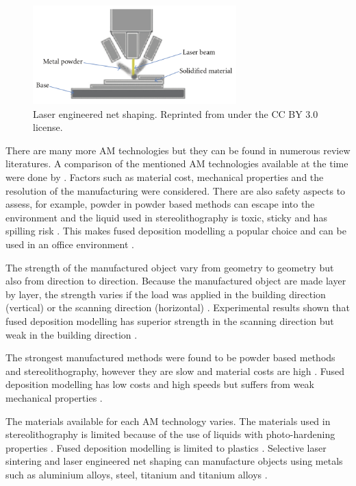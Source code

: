 \begin{figure}
  \centering
  \includegraphics[width=0.7\textwidth]{../figures/literatureReview/literature_lens.png}
  \caption{Laser engineered net shaping. Reprinted from \citep{wong2012review} under the CC BY 3.0 license.}
  \label{fig:literature_lens}
\end{figure}

There are many more AM technologies but they can be found in numerous review literatures. A comparison of the mentioned AM technologies available at the time were done by \cite{pham1998comparison, kim2008benchmark}. Factors such as material cost, mechanical properties and the resolution of the manufacturing were considered. There are also safety aspects to assess, for example, powder in powder based methods can escape into the environment and the liquid used in stereolithography is toxic, sticky and has spilling risk \citep{kim2008benchmark}. This makes fused deposition modelling a popular choice and can be used in an office environment \citep{ngo2018additive}.

The strength of the manufactured object vary from geometry to geometry but also from direction to direction. Because the manufactured object are made layer by layer, the strength varies if the load was applied in the building direction (vertical) or the scanning direction (horizontal) \citep{kim2008benchmark}. Experimental results shown that fused deposition modelling has superior strength in the scanning direction but weak in the building direction \citep{kim2008benchmark}.

The strongest manufactured methods were found to be powder based methods and stereolithography, however they are slow and material costs are high \citep{kim2008benchmark}. Fused deposition modelling has low costs and high speeds but suffers from weak mechanical properties \citep{ngo2018additive}.

The materials available for each AM technology varies. The materials used in stereolithography is limited because of the use of liquids with photo-hardening properties \citep{ngo2018additive}. Fused deposition modelling is limited to plastics \citep{ngo2018additive}. Selective laser sintering and laser engineered net shaping can manufacture objects using metals such as aluminium alloys, steel, titanium and titanium alloys \citep{herzog2016additive}.

